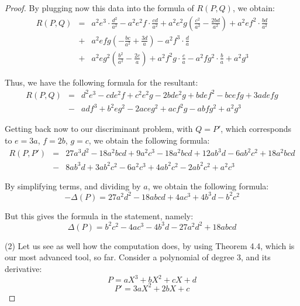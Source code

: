 \documentclass[12pt]{amsbook}
\begin{document}
\begin{proof}
By plugging now this data into the formula of $R(P,Q)$, we obtain:
\begin{eqnarray*}
R(P,Q)
&=&a^2e^3\cdot\frac{d^2}{a^2}-a^2e^2f\cdot\frac{cd}{a^2}+a^2e^2g\left(\frac{c^2}{a^2}-\frac{2bd}{a^2}\right)+a^2ef^2\cdot\frac{bd}{a^2}\\
&+&a^2efg\left(-\frac{bc}{a^2}+\frac{3d}{a}\right)-a^2f^3\cdot\frac{d}{a}\\
&+&a^2eg^2\left(\frac{b^2}{a^2}-\frac{2c}{a}\right)+a^2f^2g\cdot\frac{c}{a}-a^2fg^2\cdot\frac{b}{a}+a^2g^3
\end{eqnarray*}

Thus, we have the following formula for the resultant:
\begin{eqnarray*}
R(P,Q)
&=&d^2e^3-cde^2f+c^2e^2g-2bde^2g+bdef^2-bcefg+3adefg\\
&-&adf^3+b^2eg^2-2aceg^2+acf^2g-abfg^2+a^2g^3
\end{eqnarray*}

Getting back now to our discriminant problem, with $Q=P'$, which corresponds to $e=3a$, $f=2b$, $g=c$, we obtain the following formula:
\begin{eqnarray*}
R(P,P')
&=&27a^3d^2-18a^2bcd+9a^2c^3-18a^2bcd+12ab^3d-6ab^2c^2+18a^2bcd\\
&-&8ab^3d+3ab^2c^2-6a^2c^3+4ab^2c^2-2ab^2c^2+a^2c^3
\end{eqnarray*}

By simplifying terms, and dividing by $a$, we obtain the following formula:
$$-\Delta(P)=27a^2d^2-18abcd+4ac^3+4b^3d-b^2c^2$$

But this gives the formula in the statement, namely:
$$\Delta(P)=b^2c^2-4ac^3-4b^3d-27a^2d^2+18abcd$$

(2) Let us see as well how the computation does, by using Theorem 4.4, which is our most advanced tool, so far. Consider a polynomial of degree 3, and its derivative:
$$P=aX^3+bX^2+cX+d$$
$$P'=3aX^2+2bX+c$$


\end{proof}
\end{document}
